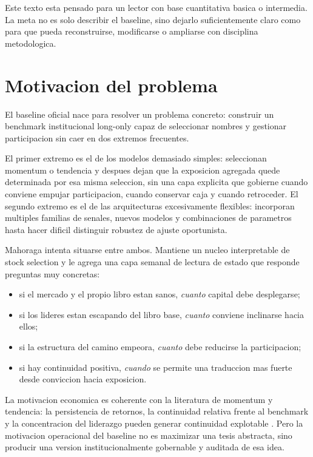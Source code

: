 \documentclass[11pt,letterpaper]{article}
\begin{document}
Este texto esta pensado para un lector con base cuantitativa basica o intermedia. La meta no es solo describir el baseline, sino dejarlo suficientemente claro como para que pueda reconstruirse, modificarse o ampliarse con disciplina metodologica.

\section{Motivacion del problema}
El baseline oficial nace para resolver un problema concreto: construir un benchmark institucional long-only capaz de seleccionar nombres y gestionar participacion sin caer en dos extremos frecuentes.

El primer extremo es el de los modelos demasiado simples: seleccionan momentum o tendencia y despues dejan que la exposicion agregada quede determinada por esa misma seleccion, sin una capa explicita que gobierne cuando conviene empujar participacion, cuando conservar caja y cuando retroceder. El segundo extremo es el de las arquitecturas excesivamente flexibles: incorporan multiples familias de senales, nuevos modelos y combinaciones de parametros hasta hacer dificil distinguir robustez de ajuste oportunista.

Mahoraga intenta situarse entre ambos. Mantiene un nucleo interpretable de stock selection y le agrega una capa semanal de lectura de estado que responde preguntas muy concretas:

\begin{itemize}
    \item si el mercado y el propio libro estan sanos, \emph{cuanto} capital debe desplegarse;
    \item si los lideres estan escapando del libro base, \emph{cuanto} conviene inclinarse hacia ellos;
    \item si la estructura del camino empeora, \emph{cuanto} debe reducirse la participacion;
    \item si hay continuidad positiva, \emph{cuando} se permite una traduccion mas fuerte desde conviccion hacia exposicion.
\end{itemize}

La motivacion economica es coherente con la literatura de momentum y tendencia: la persistencia de retornos, la continuidad relativa frente al benchmark y la concentracion del liderazgo pueden generar continuidad explotable \citep{jegadeeshTitman1993,moskowitzOoiPedersen2012,asnessMoskowitzPedersen2013}. Pero la motivacion operacional del baseline no es maximizar una tesis abstracta, sino producir una version institucionalmente gobernable y auditada de esa idea.
\end{document}
